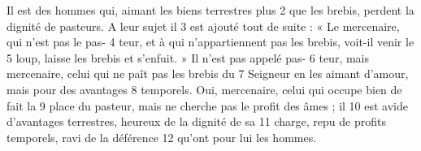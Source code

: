 Il est des hommes qui, aimant les biens terrestres plus	 
2	 	que les brebis, perdent la dignité de pasteurs. A leur sujet il	 
3	 	est ajouté tout de suite : « Le mercenaire, qui n'est pas le pas-	 
4	 	teur, et à qui n'appartiennent pas les brebis, voit-il venir le	 
5	 	loup, laisse les brebis et s'enfuit. » Il n'est pas appelé pas-	 
6	 	teur, mais mercenaire, celui qui ne paît pas les brebis du	 
7	 	Seigneur en les aimant d'amour, mais pour des avantages	 
8	 	temporels. Oui, mercenaire, celui qui occupe bien de fait la	 
9	 	place du pasteur, mais ne cherche pas le profit des âmes ; il	 
10	 	est avide d'avantages terrestres, heureux de la dignité de sa	 
11	 	charge, repu de profits temporels, ravi de la déférence	 
12	 	qu'ont pour lui les hommes.